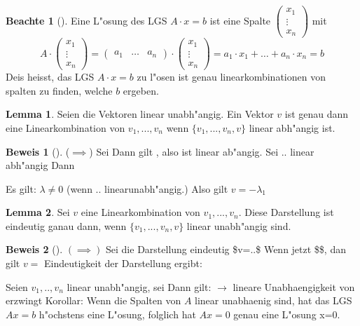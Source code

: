 \documentclass[oneside,fontsize=11pt,paper=a4,BCOR=0mm,DIV=12,automark,headsepline]{scrbook}
\theoremstyle{remark}
\theoremstyle{definition}
\newtheorem*{notte}{Beachte}
\newtheorem{lemma}{Lemma}[section]
\theoremstyle{definition}
\newtheorem*{prof}{Beweis}
\theoremstyle{remark}
\begin{document}
\begin{notte}[]
  Eine L"osung des LGS \(A\cdot x=b\) ist eine Spalte $\begin{pmatrix} x_1\\ \vdots \\ x_n  \end{pmatrix}$ mit \[A\cdot \begin{pmatrix} x_1\\ \vdots \\ x_n  \end{pmatrix} = \begin{pmatrix} a_1 & \dots & a_n \end{pmatrix}\cdot \begin{pmatrix} x_1\\ \vdots \\ x_n  \end{pmatrix} = a_1\cdot x_1 + \dots + a_n\cdot x_n = b\]
  Deis heisst, das LGS \(A\cdot x=b\) zu l"osen ist genau linearkombinationen von spalten
  zu finden, welche \(b\) ergeben.
\end{notte}

\begin{lemma}
  Seien die Vektoren linear unabh"angig. Ein Vektor \(v\) ist genau dann
  eine Linearkombination von \(v_1,...,v_n\) wenn \(\{v_1,...,v_n,v\}\) linear abh"angig ist.
\end{lemma}

\begin{prof}[]
  (\(\implies\)) Sei Dann gilt , also ist linear ab"angig.
  Sei .. linear abh"angig  Dann 

  Es gilt: \(\lambda \not= 0\) (wenn  .. linearunabh"angig.) Also gilt \(v=-\lambda_1\)
\end{prof}

\begin{lemma}
  Sei \(v\) eine Linearkombination von \(v_1,...,v_n\). Diese
  Darstellung ist eindeutig ganau dann, wenn \(\{v_1,...,v_n, v\}\) linear unabh"angig sind.
\end{lemma}

\begin{prof}[]
  \((\implies)\) Sei die Darstellung eindeutig \$v=..\$ Wenn jetzt \$\$, dan gilt \(v=\)
  Eindeutigkeit der Darstellung ergibt:

  Seien \(v_1,..,v_n\) linear unabh"angig, sei 
  Dann gilt: \(\rightarrow\) lineare Unabhaengigkeit von erzwingt Korollar: Wenn die
  Spalten von \(A\) linear unabhaenig sind, hat das LGS \(Ax=b\) h"ochstens eine
  L"osung, folglich hat \(Ax=0\) genau eine L"osung x=0.
\end{prof}
\end{document}
